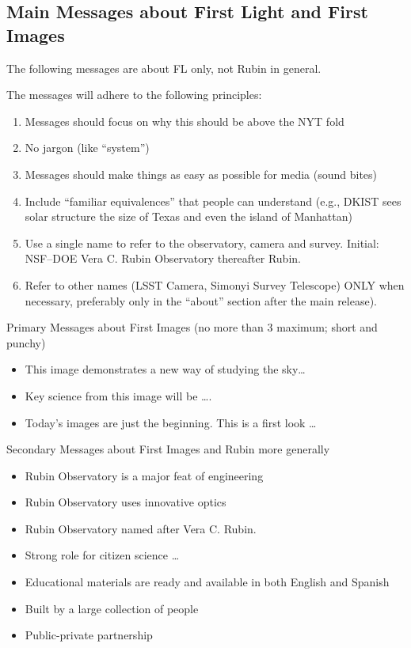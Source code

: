 \subsection{Main Messages about First Light and First Images }
The following messages are about FL only, not Rubin in general.

The messages will adhere to the following principles:
\begin{enumerate}
\item Messages should focus on why this should be above the NYT fold
\item No jargon (like “system”)
\item Messages should make things as easy as possible for media (sound bites)
\item Include “familiar equivalences” that people can understand (e.g., DKIST sees solar structure the size of Texas and even the island of Manhattan)
\item Use a single name to refer to the observatory, camera and survey. Initial: NSF–DOE Vera C. Rubin Observatory thereafter Rubin.
\item Refer to other names (LSST Camera, Simonyi Survey Telescope) ONLY when necessary, preferably only in the “about” section after the main release).
\end{enumerate}

Primary Messages about First Images (no more than 3 maximum; short and punchy)
\begin{itemize}
\item This image demonstrates a new way of studying the sky…
\item Key science from this image will be ….
\item Today’s images are just the beginning. This is a first look  …
\end{itemize}

Secondary Messages about First Images and Rubin more generally
\begin{itemize}
\item Rubin Observatory is a major feat of engineering
\item Rubin Observatory uses innovative optics
\item Rubin Observatory named after Vera C. Rubin.
\item Strong role for citizen science …
\item Educational materials are ready and available in both English and Spanish
\item Built by a large collection of people
\item Public-private partnership
\end{itemize}

